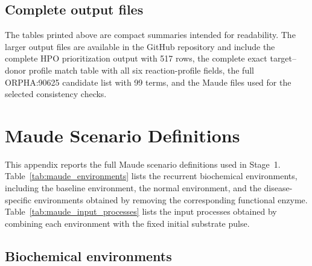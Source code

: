 \subsection{Complete output files}
\label{supsec:complete_output_files}

The tables printed above are compact summaries intended for readability. The larger output files are available in the GitHub repository and include the complete HPO prioritization output with 517 rows, the complete exact target--donor profile match table with all six reaction-profile fields, the full ORPHA:90625 candidate list with 99 terms, and the Maude files used for the selected consistency checks.


\FloatBarrier
\clearpage


\section{Maude Scenario Definitions}
\label{app:maude_scenarios}

This appendix reports the full Maude scenario definitions used in Stage~1.
Table~\ref{tab:maude_environments} lists the recurrent biochemical
environments, including the baseline environment, the normal environment, and
the disease-specific environments obtained by removing the corresponding
functional enzyme. Table~\ref{tab:maude_input_processes} lists the input
processes obtained by combining each environment with the fixed initial
substrate pulse.

\subsection{Biochemical environments}
\label{app:maude_environments_section}

\begingroup
\scriptsize
\setlength{\tabcolsep}{3pt}
\renewcommand{\arraystretch}{1.15}

